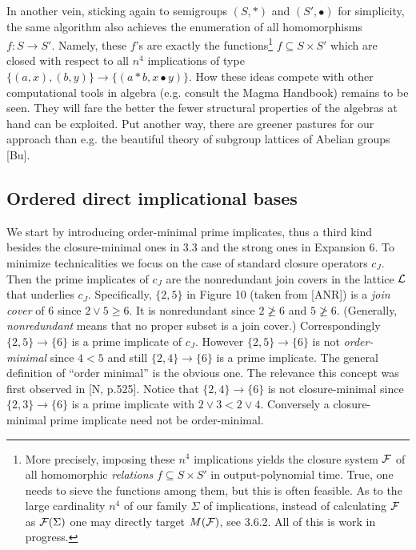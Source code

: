 \documentclass[11pt]{article}
\newcommand{\ra}{\rightarrow}
\begin{document}
In another vein, sticking again to semigroups $(S, \ast)$ and $(S', \bullet)$ for simplicity, the same algorithm also achieves the enumeration of all homomorphisms $f: S \ra S'$. Namely, these $f$'s are exactly the functions\footnote{More precisely, imposing these $n^4$ implications yields the closure system ${\cal F}$ of all homomorphic {\it relations} $f \subseteq S \times S'$ in output-polynomial time.  True, one needs to sieve the functions among them, but this is often feasible. As to the large cardinality $n^4$ of our family $\Sigma$ of implications, instead of calculating ${\cal F}$ as ${\cal F}(\Sigma)$ one may directly target $M({\cal F})$, see 3.6.2. All of this is work in progress.}  $f \subseteq S \times S'$ which are closed with respect to all $n^4$ implications of type $\{(a,x), (b,y)\} \ra \{(a \ast b, x \bullet y)\}$. How these ideas compete with other computational tools in algebra (e.g. consult the Magma Handbook) remains to be seen. They will fare the better the fewer structural properties of the algebras at hand can be exploited. Put another way, there are greener pastures for our approach than e.g. the beautiful theory of subgroup lattices of Abelian groups [Bu].  

 
\subsection{Ordered direct implicational bases}

We start by introducing order-minimal prime implicates, thus a third kind besides the closure-minimal ones in 3.3 and the strong ones in Expansion 6. To minimize technicalities we focus on the case of standard closure operators $c_J$. Then the prime implicates of $c_J$ are the nonredundant join covers in the lattice ${\cal L}$ that underlies $c_J$. Specifically, $\{2, 5\}$ in Figure 10 (taken from [ANR]) is a {\it join cover} of 6 since $2 \vee 5 \geq 6$. It is nonredundant since $2 \not\geq 6$ and $5 \not\geq 6$. (Generally,  {\it nonredundant} means that no proper subset is  a join cover.) Correspondingly $\{2,5\} \ra \{6\}$ is a prime implicate of $c_J$. However $\{2, 5\} \ra \{6\}$ is not {\it order-minimal} since $4 < 5$ and still $\{2, 4\} \ra \{6\}$ is a prime implicate. The general definition of ``order minimal'' is the obvious one. The relevance this concept was first observed in [N, p.525]. Notice that $\{2, 4\} \ra \{6\}$ is not closure-minimal since $\{2,3\} \ra \{6\}$ is a prime implicate with $2 \vee 3 < 2 \vee 4$. Conversely a closure-minimal prime implicate need not be order-minimal.
\end{document}
